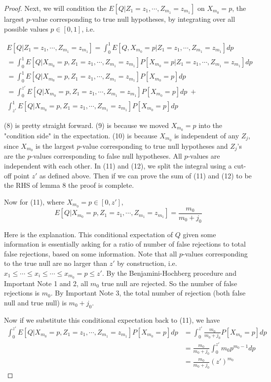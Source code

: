 \documentclass[12pt]{article}
\theoremstyle{plain}
\theoremstyle{definition}
\theoremstyle{remark}
\begin{document}
\begin{proof}
Next, we will condition the $E[Q|Z_1=z_1,\cdots,Z_{m_1}=z_{m_1}]$ on $X_{m_0}=p$, the largest $p$-value corresponding to true null hypotheses, by integrating over all possible values $p\in[0,1]$, i.e. 

\begin{gather}
E[Q|Z_1=z_1,\cdots,Z_{m_1}=z_{m_1}]=\int_0^1 E[Q,X_{m_0}=p|Z_1=z_1,\cdots,Z_{m_1}=z_{m_1}]dp\\
=\int_0^1E[Q|X_{m_0}=p,Z_1=z_1,\cdots,Z_{m_1}=z_{m_1}]P[X_{m_0}=p|Z_1=z_1,\cdots,Z_{m_1}=z_{m_1}]dp\\
=\int_0^1E[Q|X_{m_0}=p,Z_1=z_1,\cdots,Z_{m_1}=z_{m_1}]P[X_{m_0}=p]dp\\
=\int_0^{z'}E[Q|X_{m_0}=p,Z_1=z_1,\cdots,Z_{m_1}=z_{m_1}]P[X_{m_0}=p]dp\;+\\\int_{z'}^1E[Q|X_{m_0}=p,Z_1=z_1,\cdots,Z_{m_1}=z_{m_1}]P[X_{m_0}=p]dp
\end{gather}

(8) is pretty straight forward. (9) is because we moved $X_{m_0}=p$ into the "condition side" in the expectation. (10) is because $X_{m_0}$ is independent of any $Z_j$, since $X_{m_0}$ is the largest $p$-value corresponding to true null hypotheses and $Z_j$'s are the $p$-values corresponding to false null hypotheses. All $p$-values are independent with each other. In (11) and (12), we split the integral using a cut-off point $z'$ as defined above. Then if we can prove the sum of (11) and (12) to be the RHS of lemma 8 the proof is complete.

Now for (11), where $X_{m_0}=p\in [0,z']$, $$E[Q|X_{m_0}=p,Z_1=z_1,\cdots,Z_{m_1}=z_{m_1}]=\frac{m_0}{m_0+j_0}$$

Here is the explanation. This conditional expectation of $Q$ given some information is essentially asking for a ratio of number of false rejections to total false rejections, based on some information. Note that all $p$-values corresponding to the true null are no larger than $z'$ by construction, i.e. $x_1\leq \cdots\leq x_i\leq \cdots\leq x_{m_0}=p\leq z'$. By the Benjamini-Hochberg procedure and Important Note 1 and 2, all $m_0$ true null are rejected. So the number of false rejections is $m_0$. By Important Note 3, the total number of rejection (both false null and true null) is $m_0+j_0$. 

Now if we substitute this conditional expectation back to (11), we have
\begin{align}
    \int_0^{z'}E[Q|X_{m_0}=p,Z_1=z_1,\cdots,Z_{m_1}=z_{m_1}]P[X_{m_0}=p]dp 
    &=\int_0^{z'}\frac{m_0}{m_0+j_0}P[X_{m_0}=p]dp\\
    &=\frac{m_0}{m_0+j_0}\int_0^{z'}m_0p^{m_0-1}dp\\
    &=\frac{m_0}{m_0+j_0}(z')^{m_0}
\end{align}


\end{proof}
\end{document}
